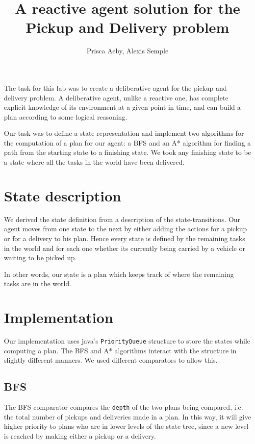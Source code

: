 \documentclass[12pt,a4paper]{article}
\author{Prisca Aeby, Alexis Semple}
\title{A reactive agent solution for the Pickup and Delivery problem}
\date{}
\begin{document}
\maketitle

The task for this lab was to create a deliberative agent for the pickup and delivery problem. A deliberative agent, unlike a reactive one, has complete explicit knowledge of its environment at a given point in time, and can build a plan according to some logical reasoning. 

Our task was to define a state representation and implement two algorithms for the computation of a plan for our agent: a BFS and an A* algorithm for finding a path from the starting state to a finishing state. We took any finishing state to be a state where all the tasks in the world have been delivered.
 
\section{State description}
We derived the state definition from a description of the state-transitions. Our agent moves from one state to the next by either adding the actions for a pickup or for a delivery to his plan. Hence every state is defined by the remaining tasks in the world and for each one whether its currently being carried by a vehicle or waiting to be picked up.

In other words, our state is a plan which keeps track of where the remaining tasks are in the world.

\section{Implementation}
Our implementation uses java's \texttt{PriorityQueue} structure to store the states while computing a plan. The BFS and A* algorithms interact with the structure in slightly different manners. We used different comparators to allow this.

\subsection*{BFS}
The BFS comparator compares the \texttt{depth} of the two plans being compared, i.e. the total number of pickups and deliveries made in a plan. In this way, it will give higher priority to plans who are in lower levels of the state tree, since a new level is reached by making either a pickup or a delivery. 
\end{document}
